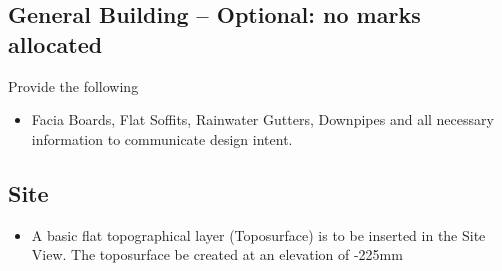 \subsection*{General Building -- Optional: no marks allocated}
Provide the following
\begin{itemize}
	\item Facia Boards, Flat Soffits, Rainwater Gutters, Downpipes and all necessary information to communicate design intent.
\end{itemize}


\subsection*{Site}
\begin{itemize}
	\item A basic flat topographical layer (Toposurface) is to be inserted in the Site View.  The toposurface be created at an elevation of -225mm
\end{itemize}


